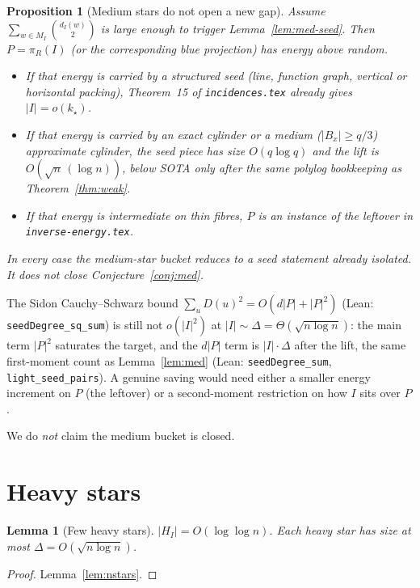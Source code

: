 \documentclass[11pt]{article}
\newtheorem{lemma}[theorem]{Lemma}
\newtheorem{proposition}[theorem]{Proposition}
\theoremstyle{definition}
\newcommand{\bin}[2]{\binom{#1}{#2}}
\begin{document}
\begin{proposition}[Medium stars do not open a new gap]\label{prop:med-reduce}
Assume $\sum_{w\in M_I}\bin{d_I(w)}{2}$ is large enough to trigger
Lemma~\ref{lem:med-seed}.
Then $P=\pi_R(I)$ (or the corresponding blue projection) has energy above
random.
\begin{itemize}
  \item If that energy is carried by a structured seed
        (line, function graph, vertical or horizontal packing),
        Theorem~15 of \texttt{incidences.tex} already gives
        $|I|=o(k_{\star})$.
  \item If that energy is carried by an exact cylinder or a medium
        ($|B_x|\ge q/3$) approximate cylinder, the seed piece has size
        $O(q\log q)$ and the lift is $O(\sqrt{n}\,(\log n))$, below SOTA
        only after the same polylog bookkeeping as Theorem~\ref{thm:weak}.
  \item If that energy is intermediate on thin fibres, $P$ is an instance
        of the leftover in \texttt{inverse-energy.tex}.
\end{itemize}
In every case the medium-star bucket reduces to a seed statement already
isolated. It does not close Conjecture~\ref{conj:med}.
\end{proposition}

The Sidon Cauchy--Schwarz bound
$\sum_u D(u)^{2}=O(d|P|+|P|^{2})$
(Lean: \texttt{seedDegree\_sq\_sum}) is still not $o(|I|^{2})$ at
$|I|\sim\Delta=\Theta(\sqrt{n\log n})$:
the main term $|P|^{2}$ saturates the target, and the $d|P|$ term is
$|I|\cdot\Delta$ after the lift, the same first-moment count as
Lemma~\ref{lem:med} (Lean: \texttt{seedDegree\_sum},
\texttt{light\_seed\_pairs}).
A genuine saving would need either a smaller energy increment on $P$
(the leftover) or a second-moment restriction on how $I$ sits over $P$.

We do \emph{not} claim the medium bucket is closed.

\section{Heavy stars}

\begin{lemma}[Few heavy stars]\label{lem:heavy-few}
$|H_I|=O(\log\log n)$.
Each heavy star has size at most $\Delta=O(\sqrt{n\log n})$.
\end{lemma}

\begin{proof}
Lemma~\ref{lem:nstars}.
\end{proof}
\end{document}
